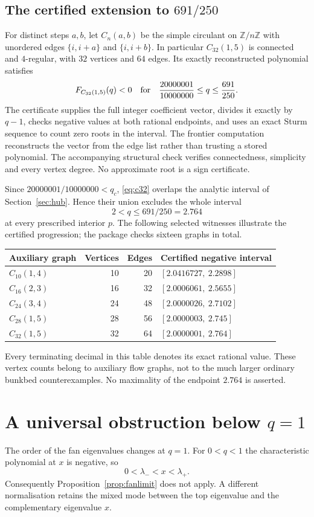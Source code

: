 \documentclass[11pt,a4paper]{article}
\theoremstyle{remark}\newtheorem{remark}[theorem]{Remark}
\begin{document}
\subsection{The certified extension to $691/250$}\label{sec:circulant}
For distinct steps $a,b$, let $C_n(a,b)$ be the simple circulant on $\mathbb Z/n\mathbb Z$ with unordered edges $\{i,i+a\}$ and $\{i,i+b\}$. In particular $C_{32}(1,5)$ is connected and $4$-regular, with $32$ vertices and $64$ edges. Its exactly reconstructed polynomial satisfies
\begin{equation}\label{eq:c32}
F_{C_{32}(1,5)}(q)<0\quad\hbox{for}\quad
\frac{20000001}{10000000}\le q\le\frac{691}{250}.
\end{equation}
The certificate supplies the full integer coefficient vector, divides it exactly by $q-1$, checks negative values at both rational endpoints, and uses an exact Sturm sequence to count zero roots in the interval. The frontier computation reconstructs the vector from the edge list rather than trusting a stored polynomial. The accompanying structural check verifies connectedness, simplicity and every vertex degree. No approximate root is a sign certificate.

Since $20000001/10000000<q_c$, \eqref{eq:c32} overlaps the analytic interval of Section~\ref{sec:hub}. Hence their union excludes the whole interval
\[
\boxed{\quad 2<q\le691/250=2.764\quad}
\]
at every prescribed interior $p$. The following selected witnesses illustrate the certified progression; the package checks sixteen graphs in total.
\begin{center}
\begin{tabular}{lrrl}
\toprule
Auxiliary graph & Vertices & Edges & Certified negative interval\\
\midrule
$C_{10}(1,4)$ &10&20&$[2.0416727,\ 2.2898]$\\
$C_{16}(2,3)$ &16&32&$[2.0006061,\ 2.5655]$\\
$C_{24}(3,4)$ &24&48&$[2.0000026,\ 2.7102]$\\
$C_{28}(1,5)$ &28&56&$[2.0000003,\ 2.745]$\\
$C_{32}(1,5)$ &32&64&$[2.0000001,\ 2.764]$\\
\bottomrule
\end{tabular}
\end{center}
Every terminating decimal in this table denotes its exact rational value. These vertex counts belong to auxiliary flow graphs, not to the much larger ordinary bunkbed counterexamples. No maximality of the endpoint $2.764$ is asserted.
\section{A universal obstruction below $q=1$}\label{sec:below}
The order of the fan eigenvalues changes at $q=1$. For $0<q<1$ the characteristic polynomial at $x$ is negative, so
\[
0<\lambda_-<x<\lambda_+.
\]
Consequently Proposition~\ref{prop:fanlimit} does not apply. A different normalisation retains the mixed mode between the top eigenvalue and the complementary eigenvalue $x$.
\end{document}
